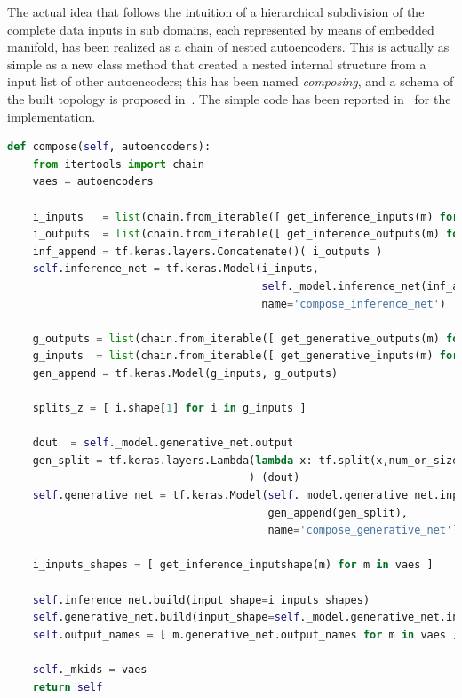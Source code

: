 The actual idea that follows the intuition of a hierarchical subdivision of the complete data inputs in sub domains, each represented by means of embedded manifold, has been realized as a chain of nested autoencoders. This is actually as simple as a new class method that created a nested internal structure from a input list of other autoencoders; this has been named \textit{composing}, and a schema of the built topology is proposed in~\Figure{\ref{fig:VAE_compose}}.
The simple code has been reported in~\Code{\ref{code:VAE_compose}} for the \TF implementation.
%
\begin{lstlisting}[language=Python, caption=Internal VAE method to create the composed network topology, label=code:VAE_compose]
def compose(self, autoencoders):
    from itertools import chain 
    vaes = autoencoders

    i_inputs   = list(chain.from_iterable([ get_inference_inputs(m) for m in vaes ]))
    i_outputs  = list(chain.from_iterable([ get_inference_outputs(m) for m in vaes ]))
    inf_append = tf.keras.layers.Concatenate()( i_outputs )
    self.inference_net = tf.keras.Model(i_inputs, 
                                        self._model.inference_net(inf_append), 
                                        name='compose_inference_net')
    
    g_outputs = list(chain.from_iterable([ get_generative_outputs(m) for m in vaes ]))
    g_inputs  = list(chain.from_iterable([ get_generative_inputs(m) for m in vaes ]))
    gen_append = tf.keras.Model(g_inputs, g_outputs)
    
    splits_z = [ i.shape[1] for i in g_inputs ]

    dout  = self._model.generative_net.output
    gen_split = tf.keras.layers.Lambda(lambda x: tf.split(x,num_or_size_splits=splits_z, axis=1)
                                      ) (dout)        
    self.generative_net = tf.keras.Model(self._model.generative_net.inputs, 
                                         gen_append(gen_split), 
                                         name='compose_generative_net')        
    
    i_inputs_shapes = [ get_inference_inputshape(m) for m in vaes ]

    self.inference_net.build(input_shape=i_inputs_shapes)
    self.generative_net.build(input_shape=self._model.generative_net.input_shape)
    self.output_names = [ m.generative_net.output_names for m in vaes ]

    self._mkids = vaes
    return self
\end{lstlisting}
